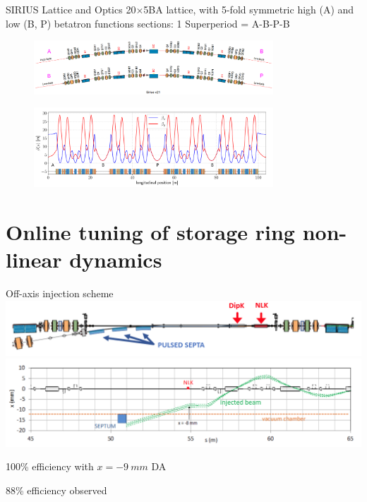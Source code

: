 \documentclass[aspectratio=169]{beamer}
\begin{document}
\begin{frame}{SIRIUS Lattice and Optics}
20$\times$5BA lattice, with 5-fold symmetric high (A) and low (B, P) betatron functions sections:  1 Superperiod = A-B-P-B
    \begin{figure}
        \centering
        \includegraphics[width=0.8\textwidth]{SI_superperiod.png}
    \end{figure}
    \begin{figure}
        \includegraphics[width=0.8\textwidth]{beta_functions.pdf}
    \end{figure}
\end{frame}

\section{Online tuning of storage ring non-linear dynamics}
\begin{frame}{Off-axis injection scheme}
    \centering
    \includegraphics[width=\textwidth]{off_axis_injection.png}
    \includegraphics[width=\textwidth]{off_axis_scheme.png}
    \begin{minipage}{0.48\textwidth}
        100\% efficiency with $x=-9~\unit{mm}$ DA
    \end{minipage}
    \hfill
    \begin{minipage}{0.48\textwidth}
        88\% efficiency observed
    \end{minipage}
\end{frame}
\end{document}
